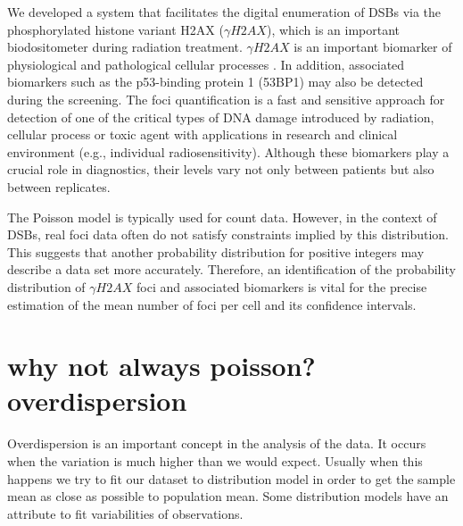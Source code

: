 We developed a system that facilitates the digital  enumeration of DSBs via the phosphorylated histone  variant H2AX ($\gamma H2AX$), which is an important  biodositometer during radiation treatment. $\gamma H2AX$ is an important biomarker of physiological and pathological cellular processes \cite{reddig_dna_2018,rodiger_quantification_2018}. In addition, associated biomarkers such as the p53-binding protein 1 (53BP1) may also be detected during the screening. The foci quantification is a fast and sensitive approach for detection of one of the critical types of DNA damage introduced by radiation, cellular process or toxic agent with applications in research and clinical environment (e.g., individual radiosensitivity). Although these biomarkers play a crucial role in diagnostics, their levels vary not only between patients but also between replicates.

The Poisson model is typically used for count data. However, in the context of DSBs, real foci data often do not satisfy constraints implied by this distribution. This suggests that another probability distribution for positive integers may describe a data set more accurately. Therefore, an identification of the probability distribution of $\gamma H2AX$ foci and associated biomarkers is vital for the precise estimation of the mean number of foci per cell and its confidence intervals.


\section{why not always poisson? overdispersion}

Overdispersion is an important concept in the analysis of the data. It occurs when the variation is much higher than we would expect. Usually when this happens we try to fit our dataset to distribution model in order to get the sample mean as close as possible to population mean. Some distribution models have an attribute to fit variabilities of observations.


